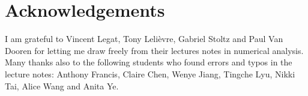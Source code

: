 \chapter*{Acknowledgements}%
\label{cha:acknowledgements}

I am grateful to Vincent Legat, Tony Lelièvre, Gabriel Stoltz and Paul Van Dooren for letting me draw freely from their lectures notes in numerical analysis.
Many thanks also to the following students who found errors and typos in the lecture notes:
Anthony Francis, Claire Chen, Wenye Jiang, Tingche Lyu, Nikki Tai, Alice Wang and Anita Ye.

